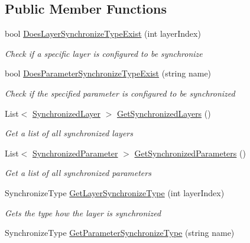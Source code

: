 \subsection*{Public Member Functions}
\begin{DoxyCompactItemize}
\item 
bool \hyperlink{class_photon_animator_view_adc769a9e9d902955529aa36fd7f94c77}{Does\+Layer\+Synchronize\+Type\+Exist} (int layer\+Index)
\begin{DoxyCompactList}\small\item\em Check if a specific layer is configured to be synchronize \end{DoxyCompactList}\item 
bool \hyperlink{class_photon_animator_view_a58c3ae7da3a1217062dd6f510c69e5a8}{Does\+Parameter\+Synchronize\+Type\+Exist} (string name)
\begin{DoxyCompactList}\small\item\em Check if the specified parameter is configured to be synchronized \end{DoxyCompactList}\item 
List$<$ \hyperlink{class_photon_animator_view_1_1_synchronized_layer}{Synchronized\+Layer} $>$ \hyperlink{class_photon_animator_view_a5cd222a56cf3364aea3fa1d2641383ed}{Get\+Synchronized\+Layers} ()
\begin{DoxyCompactList}\small\item\em Get a list of all synchronized layers \end{DoxyCompactList}\item 
List$<$ \hyperlink{class_photon_animator_view_1_1_synchronized_parameter}{Synchronized\+Parameter} $>$ \hyperlink{class_photon_animator_view_a03c466f84479ffeb0509324adfa27c5b}{Get\+Synchronized\+Parameters} ()
\begin{DoxyCompactList}\small\item\em Get a list of all synchronized parameters \end{DoxyCompactList}\item 
Synchronize\+Type \hyperlink{class_photon_animator_view_aca2599e3520233dd0a92550d2fef3781}{Get\+Layer\+Synchronize\+Type} (int layer\+Index)
\begin{DoxyCompactList}\small\item\em Gets the type how the layer is synchronized \end{DoxyCompactList}\item 
Synchronize\+Type \hyperlink{class_photon_animator_view_ab5c89d5d60a51fdd97b883f85d27a10f}{Get\+Parameter\+Synchronize\+Type} (string name)

\end{DoxyCompactItemize}
